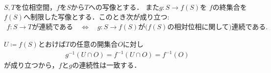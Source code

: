 	\begin{screen}
		\begin{thm}[部分空間と制限写像の連続性]
			$S,T$を位相空間，$f$を$S$から$T$への写像とする．
			また$g:S \longrightarrow f(S)$を
			$f$の終集合を$f(S)$へ制限した写像とする．このとき次が成り立つ:
			\begin{align}
				\mbox{$f:S \longrightarrow T$が連続である} 
				\quad \Longleftrightarrow \quad
				\mbox{$g:S \longrightarrow f(S)$が($f(S)$の相対位相に関して)連続である}.
			\end{align}
		\end{thm}
	\end{screen}
	
	\begin{prf}
		$U \coloneqq f(S)$とおけば$T$の任意の開集合$O$に対し
		\begin{align}
			g^{-1}(U \cap O) = f^{-1}(U \cap O) = f^{-1}(O)
		\end{align}
		が成り立つから，$f$と$g$の連続性は一致する．
		\QED
	\end{prf}